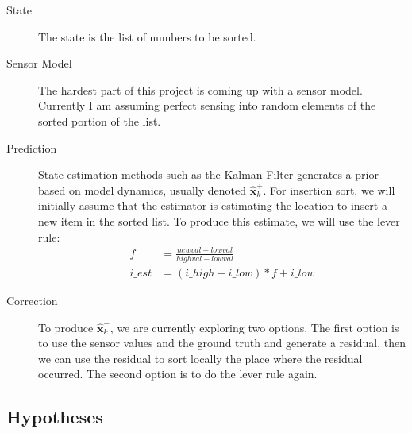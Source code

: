 \begin{description}
\item[State] The state is the list of numbers to be sorted.
\item[Sensor Model] The hardest part of this project is coming up with a
  sensor model. Currently I am assuming perfect sensing into random
  elements of the sorted portion of the list.
\item[Prediction] State estimation methods such as the Kalman Filter
  generates a prior based on model dynamics, usually denoted $
  \hat{\mathbf{x}}_{k}^{+}$. For insertion sort, we will initially
  assume that the estimator is estimating the location to insert a new item
  in the sorted list. To produce this estimate, we will use the lever
  rule:
  \begin{align}
    f &= \frac{newval - lowval}{highval - lowval} \\
    i\_est &= (i\_high - i\_low)*f + i\_low
  \end{align}  
\item[Correction] To produce $\hat{\mathbf{x}}_{k}^{-}$, we are
  currently exploring two options. The first option is to use the
  sensor values and the ground truth and generate a residual, then we
  can use the residual to sort locally the place where the residual
  occurred. The second option is to do the lever rule again.
\end{description}

\subsection{Hypotheses} \label{subsec:hypo}

